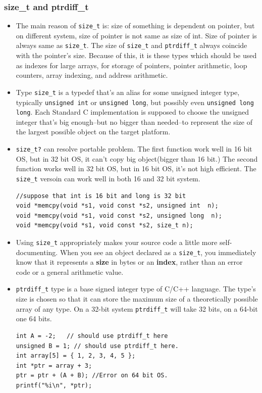 \documentclass[a4paper,11pt,twoside]{book}
\begin{document}
\subsubsection{size\_t and ptrdiff\_t}
\begin{itemize}
	\item The main reason of \texttt{size\_t} is: size of something is dependent on pointer, but on different system, size of pointer is not same as size of int.  Size of pointer is always same as \texttt{size\_t}. The size of \texttt{size\_t} and \texttt{ptrdiff\_t} always coincide with the pointer's size. Because of this, it is these types which should be used as indexes for large arrays, for storage of pointers, pointer arithmetic, loop counters, array indexing, and address arithmetic.
	
	\item Type \texttt{size\_t} is a typedef that's an alias for some unsigned integer type, typically \texttt{unsigned int} or \texttt{unsigned long}, but possibly even \texttt{unsigned long long}. Each Standard C implementation is supposed to choose the unsigned integer that's big enough--but no bigger than needed--to represent the size of the largest possible object on the target platform.
	
	\item \texttt{size\_t?} can resolve portable problem. The first function work well in 16 bit OS, but in 32 bit OS, it can't copy big object(bigger than 16 bit.) The second function works well in 32 bit OS, but in 16 bit OS, it's not high efficient. The \texttt{size\_t} versoin can work well in both 16 and 32 bit system.
	
\begin{lstlisting}
//suppose that int is 16 bit and long is 32 bit
void *memcpy(void *s1, void const *s2, unsigned int  n); 
void *memcpy(void *s1, void const *s2, unsigned long  n);
void *memcpy(void *s1, void const *s2, size_t n);
\end{lstlisting}

	\item Using \texttt{size\_t} appropriately makes your source code a little more self-documenting. When you see an object declared as a \texttt{size\_t}, you immediately know that it represents a \textbf{size} in bytes or an \textbf{index}, rather than an error code or a general arithmetic value.
	
	\item \texttt{ptrdiff\_t} type is a base signed integer type of C/C++ language. The type's size is chosen so that it can store the maximum size of a theoretically possible array of any type. On a 32-bit system \texttt{ptrdiff\_t} will take 32 bits, on a 64-bit one 64 bits.
\begin{lstlisting}[numbers=none]
int A = -2;   // should use ptrdiff_t here
unsigned B = 1; // should use ptrdiff_t here.
int array[5] = { 1, 2, 3, 4, 5 };
int *ptr = array + 3;
ptr = ptr + (A + B); //Error on 64 bit OS.
printf("%i\n", *ptr);
\end{lstlisting}
	

\end{itemize}
\end{document}
